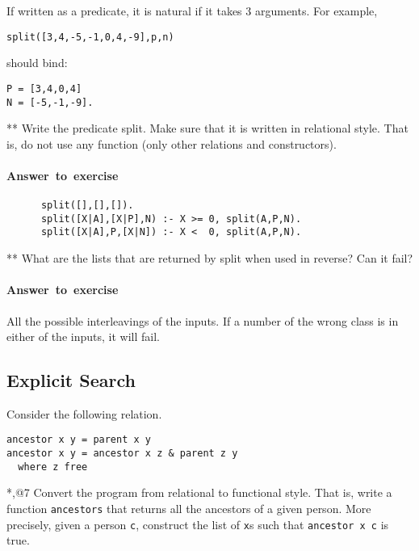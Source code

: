 \documentclass{article}
\newcounter{question}
\newenvironment{ans}{\begin{oframed}\paragraph{Answer~to~exercise~\arabic{question}}}{\end{oframed}}
\begin{document}
If written as a predicate, it is natural if it takes 3 arguments. For example,

\begin{verbatim}
split([3,4,-5,-1,0,4,-9],p,n)
\end{verbatim}

should bind:

\begin{verbatim}
P = [3,4,0,4]
N = [-5,-1,-9].
\end{verbatim}


\begin{question}{**}
  Write the predicate \textsf{split}. Make sure that it is written in
  relational style. That is, do not use any function (only other
  relations and constructors).
  \begin{ans}

    \begin{verbatim}
      split([],[],[]).
      split([X|A],[X|P],N) :- X >= 0, split(A,P,N).
      split([X|A],P,[X|N]) :- X <  0, split(A,P,N).
    \end{verbatim}
  \end{ans}
\end{question}

\begin{question}{**}
    What are the lists that are returned by \textsf{split} when used in reverse? Can it fail?
    \begin{ans}
      All the possible interleavings of the inputs. If a number of the wrong class is
      in either of the inputs, it will fail.
    \end{ans}
\end{question}

\subsection{Explicit Search}

Consider the following relation.
\begin{verbatim}
ancestor x y = parent x y
ancestor x y = ancestor x z & parent z y
  where z free
\end{verbatim}

\begin{question}{*,@7}
Convert the program from relational to functional style. That is,
write a function \texttt{ancestors} that returns all the ancestors of
a given person.  More precisely, given a person \texttt{c}, construct the
list of \texttt{x}s such that \texttt{ancestor x c} is true.
\end{question}
\end{document}
